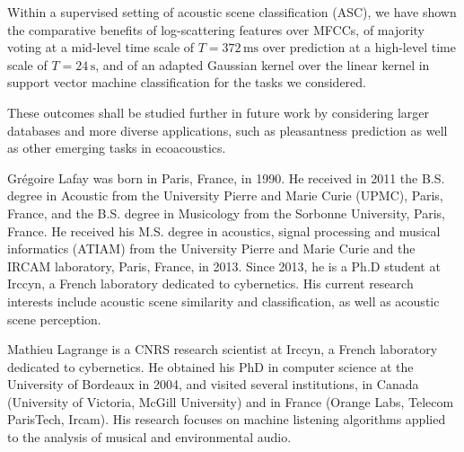 \documentclass[journal]{IEEEtran}
\newcommand{\ja}[1]{\textcolor{magenta}{Joakim : #1}}
\begin{document}
Within a supervised setting of acoustic scene classification (ASC), we have shown the comparative benefits of log-scattering features over MFCCs, of majority voting at a mid-level time scale of $T=372\,\mathrm{ms}$ over prediction at a high-level time scale of $T=24\,\mathrm{s}$, and of an adapted Gaussian kernel over the linear kernel in support vector machine classification for the tasks we considered.

These outcomes shall be studied further in future work by considering larger databases and more diverse applications, such as pleasantness prediction \cite{lafaySoundscapePilot} as well as other emerging tasks in ecoacoustics.





\begin{IEEEbiography}{Gr\'egoire Lafay} was born in Paris, France, in 1990. He received in 2011 the B.S. degree in Acoustic from the University Pierre and Marie Curie (UPMC), Paris, France, and the B.S. degree in Musicology from the Sorbonne University, Paris, France. He received his M.S. degree in acoustics, signal processing and musical informatics (ATIAM) from the University Pierre and Marie Curie and the IRCAM laboratory, Paris, France, in 2013. Since 2013, he is a Ph.D student at Irccyn, a French laboratory dedicated to cybernetics. His current research interests include acoustic scene similarity and classification, as well as acoustic scene perception. 
\end{IEEEbiography}

\begin{IEEEbiography}{Mathieu Lagrange} is a CNRS research scientist at Irccyn, a French laboratory dedicated to cybernetics. He obtained his PhD in computer science at the University of Bordeaux in 2004, and visited several institutions, in Canada (University of Victoria, McGill University) and in France (Orange Labs, Telecom ParisTech, Ircam). His research focuses on machine listening algorithms applied to the analysis of musical and environmental audio.
\end{IEEEbiography}
\end{document}
